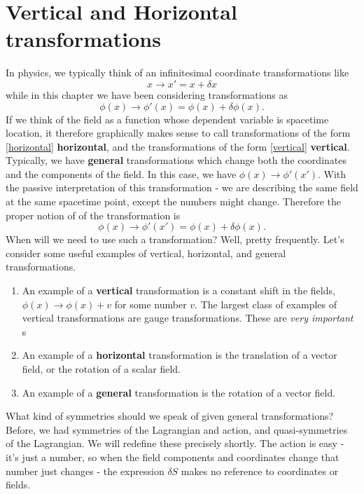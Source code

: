 \documentclass[main.tex]{subfiles}
\begin{document}
\section{Vertical and Horizontal transformations}
In physics, we typically think of an infinitesimal coordinate transformations like
\begin{equation} \label{horizontal}
x \to x' = x + \delta x
\end{equation}
while in this chapter we have been considering transformations as
\begin{equation} \label{vertical}
\phi(x) \to \phi'(x) = \phi(x) + \delta \phi(x).
\end{equation}
If we think of the field as a function whose dependent variable is spacetime location, it therefore graphically makes sense to call transformations of the form \ref{horizontal} \textbf{horizontal}, and the transformations of the form \ref{vertical} \textbf{vertical}. Typically, we have \textbf{general} transformations which change both the coordinates and the components of the field. In this case, we have $\phi(x) \to \phi' (x')$. With the passive interpretation of this transformation - we are describing the same field at the same spacetime point, except the numbers might change. Therefore the proper notion of of the transformation is 
\[
\phi(x) \to \phi'(x') = \phi(x) + \delta \phi(x).
\]
When will we need to use such a transformation? Well, pretty frequently. Let's consider some useful examples of vertical, horizontal, and general transformations.
\begin{enumerate}
\item An example of a \textbf{vertical} transformation is a constant shift in the fields, $\phi(x) \to \phi(x) + v$ for some number $v$. The largest class of examples of vertical transformations are gauge transformations. These are \textit{very important} s

\item An example of a \textbf{horizontal} transformation is the translation of a vector field, or the rotation of a scalar field.

\item An example of a \textbf{general} transformation is the rotation of a vector field.
\end{enumerate}

What kind of symmetries should we speak of given general transformations? Before, we had symmetries of the Lagrangian and action, and quasi-symmetries of the Lagrangian. We will redefine these precisely shortly. The action is easy - it's just a number, so when the field components and coordinates change that number just changes - the expression $\delta S$ makes no reference to coordinates or fields. 
\end{document}
